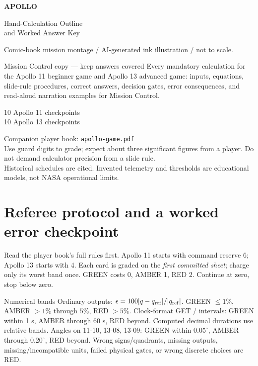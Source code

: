 \documentclass[11pt]{article}
\begin{document}
\begin{titlepage}
\centering
\vspace*{0.08in}
{\Huge\bfseries\sffamily APOLLO\par}
\vspace{0.1in}
{\LARGE\sffamily Hand-Calculation Outline\\[6pt]and Worked Answer Key\par}
\vspace{0.15in}
\resizebox{\linewidth}{!}{\ApolloCoverArt}\par
{\scriptsize Comic-book mission montage / AI-generated ink illustration / not to scale.\par}
\vspace{0.12in}
\begin{panel}{Mission Control copy --- keep answers covered}
Every mandatory calculation for the Apollo 11 beginner game and
Apollo 13 advanced game: inputs, equations, slide-rule procedures,
correct answers, decision gates, error consequences, and read-aloud
narration examples for Mission Control.
\end{panel}
\vspace{0.1in}
{\large 10 Apollo 11 checkpoints\\[6pt]10 Apollo 13 checkpoints\par}
\vfill
Companion player book: \texttt{apollo-game.pdf}\\[12pt]
Use guard digits to grade; expect about three significant figures
from a player. Do not demand calculator precision from a slide rule.
\\[20pt]
Historical schedules are cited. Invented telemetry and thresholds
are educational models, not NASA operational limits.
\end{titlepage}

\section*{Referee protocol and a worked error checkpoint}
Read the player book's full rules first. Apollo 11 starts with command
reserve 6; Apollo 13 starts with 4. Each card is graded on the
\emph{first committed sheet}; charge only its worst band once.
GREEN costs 0, AMBER 1, RED 2. Continue at zero, stop below zero.

\begin{panel}{Numerical bands}
Ordinary outputs:
\(\epsilon=100|q-q_{\rm ref}|/|q_{\rm ref}|\).
GREEN \(\leq1\%\), AMBER \(>1\%\) through \(5\%\), RED \(>5\%\).
Clock-format GET / intervals: GREEN within 1 s, AMBER through 60 s,
RED beyond. Computed decimal durations use relative bands.
Angles on 11-10, 13-08, 13-09: GREEN within \(0.05^\circ\),
AMBER through \(0.20^\circ\), RED beyond.
Wrong signs/quadrants, missing outputs, missing/incompatible units,
failed physical gates, or wrong discrete choices are RED.
\end{panel}
\end{document}
